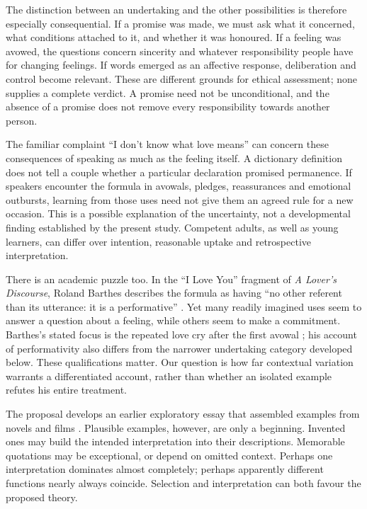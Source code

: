 \documentclass[11pt,a4paper]{article}
\begin{document}
The distinction between an undertaking and the other possibilities is therefore especially consequential. If a promise was made, we must ask what it concerned, what conditions attached to it, and whether it was honoured. If a feeling was avowed, the questions concern sincerity and whatever responsibility people have for changing feelings. If words emerged as an affective response, deliberation and control become relevant. These are different grounds for ethical assessment; none supplies a complete verdict. A promise need not be unconditional, and the absence of a promise does not remove every responsibility towards another person.

The familiar complaint “I don't know what love means” can concern these consequences of speaking as much as the feeling itself. A dictionary definition does not tell a couple whether a particular declaration promised permanence. If speakers encounter the formula in avowals, pledges, reassurances and emotional outbursts, learning from those uses need not give them an agreed rule for a new occasion. This is a possible explanation of the uncertainty, not a developmental finding established by the present study. Competent adults, as well as young learners, can differ over intention, reasonable uptake and retrospective interpretation.

There is an academic puzzle too. In the “I Love You” fragment of \emph{A Lover's Discourse}, Roland Barthes describes the formula as having “no other referent than its utterance: it is a performative” \citep[p.~148]{barthes1978}. Yet many readily imagined uses seem to answer a question about a feeling, while others seem to make a commitment. Barthes's stated focus is the repeated love cry after the first avowal \citep[p.~147]{barthes1978}; his account of performativity also differs from the narrower undertaking category developed below. These qualifications matter. Our question is how far contextual variation warrants a differentiated account, rather than whether an isolated example refutes his entire treatment.

The proposal develops an earlier exploratory essay that assembled examples from novels and films \citep{rayner2014}. Plausible examples, however, are only a beginning. Invented ones may build the intended interpretation into their descriptions. Memorable quotations may be exceptional, or depend on omitted context. Perhaps one interpretation dominates almost completely; perhaps apparently different functions nearly always coincide. Selection and interpretation can both favour the proposed theory.
\end{document}
